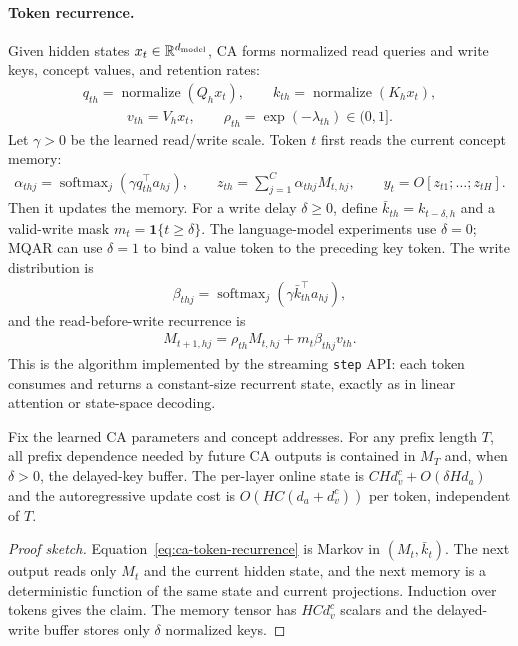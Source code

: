 \paragraph{Token recurrence.}
Given hidden states $x_t\in\mathbb{R}^{d_{\rm model}}$, CA forms normalized read queries and write keys, concept values, and retention rates:
\begin{align*}
q_{th}=\operatorname{normalize}(Q_hx_t),\qquad
k_{th}=\operatorname{normalize}(K_hx_t),
\end{align*}
\begin{align*}
v_{th}=V_hx_t,\qquad
\rho_{th}=\exp(-\lambda_{th})\in(0,1].
\end{align*}
Let $\gamma>0$ be the learned read/write scale. Token $t$ first reads the current concept memory:
\begin{align*}
\alpha_{thj}
=
\operatorname{softmax}_{j}(\gamma q_{th}^{\top}a_{hj}),
\qquad
z_{th}=\sum_{j=1}^{C}\alpha_{thj}M_{t,hj},
\qquad
y_t=O[z_{t1};\ldots;z_{tH}].
\end{align*}
Then it updates the memory. For a write delay $\delta\ge0$, define $\bar k_{th}=k_{t-\delta,h}$ and a valid-write mask $m_t=\mathbf{1}\{t\ge\delta\}$. The language-model experiments use $\delta=0$; MQAR can use $\delta=1$ to bind a value token to the preceding key token. The write distribution is
\begin{align*}
\beta_{thj}
=
\operatorname{softmax}_{j}(\gamma \bar k_{th}^{\top}a_{hj}),
\end{align*}
and the read-before-write recurrence is
\begin{align}
M_{t+1,hj}
=
\rho_{th}M_{t,hj}
+m_t\beta_{thj}v_{th}.
\label{eq:ca-token-recurrence}
\end{align}
This is the algorithm implemented by the streaming \texttt{step} API: each token consumes and returns a constant-size recurrent state, exactly as in linear attention or state-space decoding.

\begin{proposition}
\label{prop:main-ca-state}
Fix the learned CA parameters and concept addresses. For any prefix length $T$, all prefix dependence needed by future CA outputs is contained in $M_T$ and, when $\delta>0$, the delayed-key buffer. The per-layer online state is $C H d_v^c+O(\delta H d_a)$ and the autoregressive update cost is $O(HC(d_a+d_v^c))$ per token, independent of $T$.
\end{proposition}

\begin{proof}[Proof sketch]
Equation~\eqref{eq:ca-token-recurrence} is Markov in $(M_t,\bar k_t)$. The next output reads only $M_t$ and the current hidden state, and the next memory is a deterministic function of the same state and current projections. Induction over tokens gives the claim. The memory tensor has $H C d_v^c$ scalars and the delayed-write buffer stores only $\delta$ normalized keys.
\end{proof}

